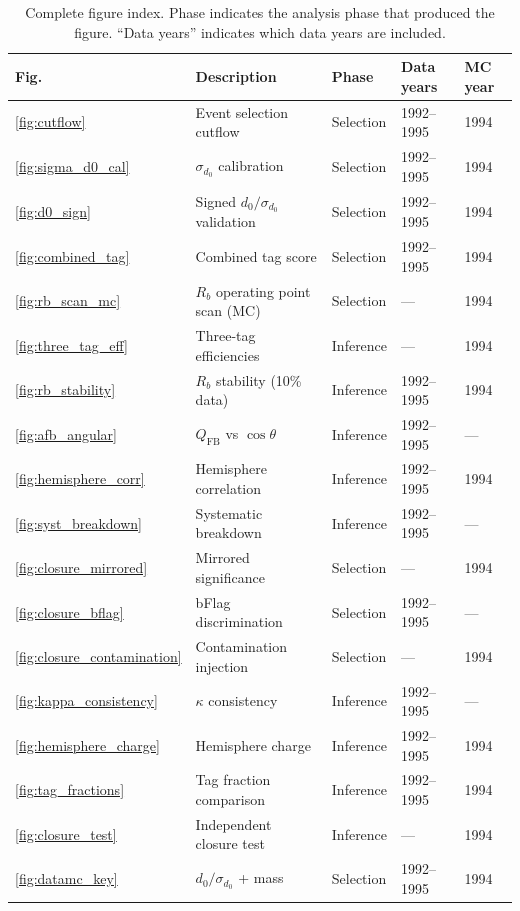 \documentclass[11pt,a4paper]{article}
\begin{document}
\begin{table}[htbp]
\centering
\caption{Complete figure index. Phase indicates the analysis phase
that produced the figure. ``Data years'' indicates which data years
are included.}
\label{tbl:figure_summary}
\begin{tabular}{p{1.0cm}p{5.5cm}p{2.0cm}p{2.5cm}p{2.0cm}}
\toprule
Fig.\ & Description & Phase & Data years & MC year \\
\midrule
\ref{fig:cutflow} & Event selection cutflow & Selection & 1992--1995 & 1994 \\
\ref{fig:sigma_d0_cal} & $\sigma_{d_0}$ calibration & Selection & 1992--1995 & 1994 \\
\ref{fig:d0_sign} & Signed $d_0/\sigma_{d_0}$ validation & Selection & 1992--1995 & 1994 \\
\ref{fig:combined_tag} & Combined tag score & Selection & 1992--1995 & 1994 \\
\ref{fig:rb_scan_mc} & $R_b$ operating point scan (MC) & Selection & --- & 1994 \\
\ref{fig:three_tag_eff} & Three-tag efficiencies & Inference & --- & 1994 \\
\ref{fig:rb_stability} & $R_b$ stability (10\% data) & Inference & 1992--1995 & 1994 \\
\ref{fig:afb_angular} & $Q_\text{FB}$ vs $\cos\theta$ & Inference & 1992--1995 & --- \\
\ref{fig:hemisphere_corr} & Hemisphere correlation & Inference & 1992--1995 & 1994 \\
\ref{fig:syst_breakdown} & Systematic breakdown & Inference & 1992--1995 & --- \\
\ref{fig:closure_mirrored} & Mirrored significance & Selection & --- & 1994 \\
\ref{fig:closure_bflag} & bFlag discrimination & Selection & 1992--1995 & --- \\
\ref{fig:closure_contamination} & Contamination injection & Selection & --- & 1994 \\
\ref{fig:kappa_consistency} & $\kappa$ consistency & Inference & 1992--1995 & --- \\
\ref{fig:hemisphere_charge} & Hemisphere charge & Inference & 1992--1995 & 1994 \\
\ref{fig:tag_fractions} & Tag fraction comparison & Inference & 1992--1995 & 1994 \\
\ref{fig:closure_test} & Independent closure test & Inference & --- & 1994 \\
\ref{fig:datamc_key} & $d_0/\sigma_{d_0}$ + mass & Selection & 1992--1995 & 1994 \\

\end{tabular}
\end{table}
\end{document}
